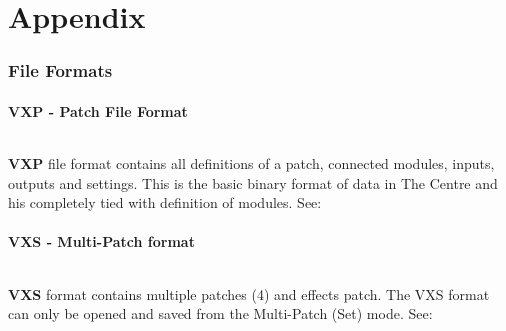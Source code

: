 \documentclass[table]{article}
\begin{document}
\ifdefined\USERMANUAL%
  \modwto%
  \modvco%
  \modlfs%
  \modlfo%
  \modenv%
  \modvca%
  \modbrm%
  \modsmp%
  \modnoi%
  \moddly%
  \moddst%
  \modvcf%
  \moddrc%
  \modclk%
  \modgat%
  \modeuc%
  \modply%
  \modrng%
  \modqnt%
  \modarp%
  \modchd%
  \modmid%
  \modmix%
  \modout%
\else



\fi

\ifdefined\USERMANUAL%
  \newpage
  \part{Appendix}
  \newpage
  \section{File Formats}\label{section:fileformats}
  \subsection{VXP - Patch File Format}
  \paragraph*{}%
  \textbf{VXP} file format contains all definitions of a patch, connected modules, inputs, outputs and settings. This is the basic binary format of data in The Centre and his completely tied with definition of modules. See: \underline{}
  \subsection{VXS - Multi-Patch format}
  \paragraph*{}%
  \textbf{VXS} format contains multiple patches (4) and effects patch. The VXS format can only be opened and saved from the Multi-Patch (Set) mode. See: \underline{}

\else
\fi
\end{document}
